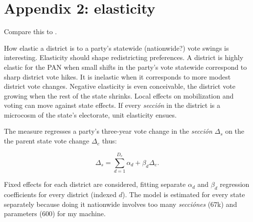 \documentclass[letter,12pt]{article}
\begin{document}
\section*{Appendix 2: elasticity} 


Compare this to \citet{linzerSeatVoteElasticity2012}.


How elastic a district is to a party's statewide (nationwide?) vote swings is interesting. Elasticity should shape redistricting preferences. A district is highly elastic for the PAN when small shifts in the party's vote statewide correspond to sharp district vote hikes. It is inelastic when it corresponds to more modest district vote changes. Negative elasticity is even conceivable, the district vote growing when the rest of the state shrinks. Local effects on mobilization and voting can move against state effects. If every \emph{secci\'on} in the district is a microcosm of the state's electorate, unit elasticity ensues. 

The measure regresses a party's three-year vote change in the \emph{secci\'on} $\Delta_s$ on the the parent state vote change $\Delta_e$ thus:  

\begin{equation}
\Delta_s = \sum\limits_{d=1}^{D_e} \alpha_d + \beta_d \Delta_e.
\end{equation}

\noindent Fixed effects for each district are considered, fitting separate $\alpha_d$ and $\beta_d$ regression coefficients for every district (indexed $d$). The model is estimated for every state separately because doing it nationwide involves too many \emph{secci\'ones} (67k) and parameters (600) for my machine. 
\end{document}
